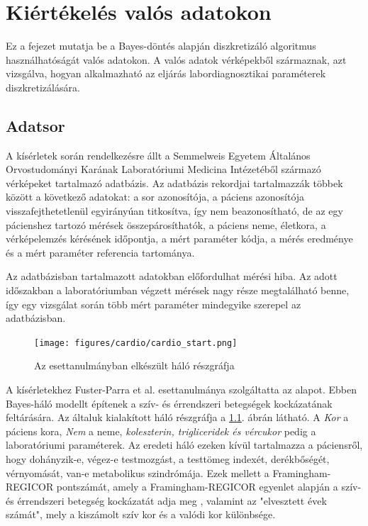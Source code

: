 \chapter{Kiértékelés valós adatokon}\label{chapter:kiertekelesvalos}

Ez a fejezet mutatja be a Bayes-döntés alapján diszkretizáló algoritmus használhatóságát valós adatokon. A valós adatok vérképekből származnak, azt vizsgálva, hogyan alkalmazható az eljárás labordiagnosztikai paraméterek diszkretizálására.

\section{Adatsor}
A kísérletek során rendelkezésre állt a Semmelweis Egyetem Általános Orvostudományi Karának Laboratóriumi Medicina Intézetéből származó vérképeket tartalmazó adatbázis. Az adatbázis rekordjai tartalmazzák többek között a következő adatokat: a sor azonosítója, a páciens azonosítója visszafejthetetlenül egyirányúan titkosítva, így nem beazonosítható, de az egy pácienshez tartozó mérések összepárosíthatók, a páciens neme, életkora, a vérképelemzés kérésének időpontja, a mért paraméter kódja, a mérés eredménye és a mért paraméter referencia tartománya.

Az adatbázisban tartalmazott adatokban előfordulhat mérési hiba. Az adott időszakban a laboratóriumban végzett mérések nagy része megtalálható benne, így egy vizsgálat során több mért paraméter mindegyike szerepel az adatbázisban.

\begin{figure}[htp]
    \centering
    \texttt{[image: figures/cardio/cardio\_start.png]}
    \caption{Az esettanulmányban elkészült háló részgráfja}
    \label{fig:cardio_start}
\end{figure}

A kísérletekhez Fuster-Parra et al. \cite{fuster2016bayesian} esettanulmánya szolgáltatta az alapot. Ebben Bayes-háló modellt építenek a szív- és érrendszeri betegségek kockázatának feltárására. Az általuk kialakított háló részgráfja a \ref{fig:cardio_start}. ábrán látható. A \emph{Kor} a páciens kora, \emph{Nem} a neme, \emph{koleszterin, trigliceridek és vércukor} pedig a laboratóriumi paraméterek. Az eredeti háló ezeken kívül tartalmazza a páciensről, hogy dohányzik-e, végez-e testmozgást, a testtömeg indexét, derékbőségét, vérnyomását, van-e metabolikus szindrómája. Ezek mellett a Framingham-REGICOR pontszámát, amely a Framingham-REGICOR egyenlet alapján a szív-és érrendszeri betegség kockázatát adja meg \cite{amor2017prediction}, valamint az "elvesztett évek számát", mely a kiszámolt szív kor és a valódi kor különbsége.

